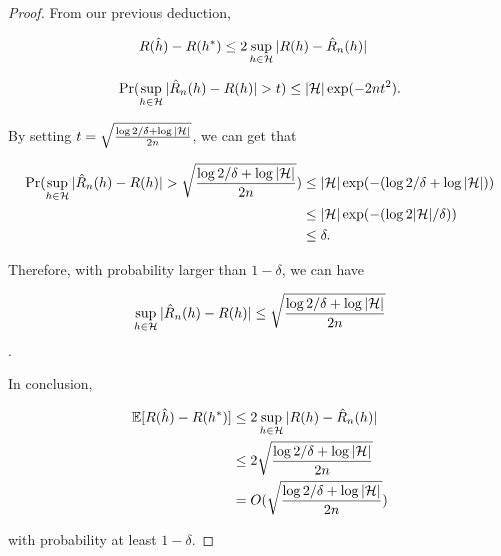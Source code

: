 \documentclass[../main.tex]{subfiles}
\begin{document}
	\begin{proof}
		From our previous deduction,
		
		\begin{equation*}
			\begin{aligned}
				R(\hat{h}) - R(h^*) & \leq  2 \sup\limits_{h\in \mathcal{H}} |R(h) - \hat{R}_n(h)|
			\end{aligned}
		\end{equation*}
		
		\begin{equation*}
			\begin{aligned}
				\Pr(\sup\limits_{h\in \mathcal{H}}|\hat{R}_n (h) - R(h)| > t)\leq |\mathcal{H}|  \exp(-2nt^2).
			\end{aligned}
		\end{equation*}
		
		By setting $t = \sqrt{\frac{\log 2 / \delta + \log |\mathcal{H}|}{2n}}$, we can get that
		
		\begin{equation*}
			\begin{aligned}
			\Pr(\sup\limits_{h\in \mathcal{H}}|\hat{R}_n (h) - R(h)| > \sqrt{\frac{\log 2 / \delta + \log |\mathcal{H}|}{2n}}) & \leq |\mathcal{H}|  \exp(- (\log 2 / \delta + \log |\mathcal{H}|)) \\
																								   & \leq |\mathcal{H}|  \exp(- (\log 2|\mathcal{H}| / \delta)) \\
																								   & \leq \delta .
			\end{aligned}
		\end{equation*}
		
		Therefore, with probability larger than $1-\delta$, we can have
		
		\begin{equation*}
			\sup\limits_{h\in \mathcal{H}}|\hat{R}_n (h) - R(h)| \leq \sqrt{\frac{\log 2 / \delta + \log |\mathcal{H}|}{2n}}
		\end{equation*}.
		
		In conclusion,
		
		\begin{equation*}
			\begin{aligned}
				\mathbb{E}[R(\hat{h}) - R(h^*)]  & \leq  2 \sup\limits_{h\in \mathcal{H}} |R(h) - \hat{R}_n(h)| \\
										  & \leq 2  \sqrt{\frac{\log 2 / \delta + \log |\mathcal{H}|}{2n}} \\
										  & = O( \sqrt{\frac{\log 2 / \delta + \log |\mathcal{H}|}{2n}})
			\end{aligned}
		\end{equation*}
		
		with probability at least $1-\delta$.
	\end{proof}
\end{document}
